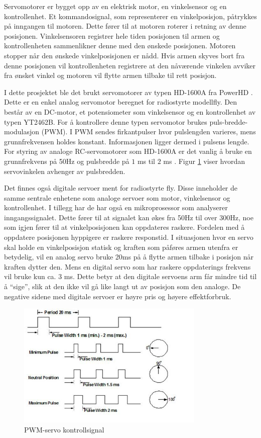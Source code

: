 Servomotorer er bygget opp av en elektrisk motor, en vinkelsensor og en kontrollenhet. Et kommandosignal, som representerer en vinkelposisjon, påtrykkes på inngangen til motoren. Dette fører til at motoren roterer i retning av denne posisjonen. Vinkelsensoren registrer hele tiden posisjonen til armen og kontrollenheten sammenlikner denne med den ønskede posisjonen. Motoren stopper når den ønskede vinkelposisjonen er nådd. Hvis armen skyves bort fra denne posisjonen vil kontrollenheten registrere at den nåværende vinkelen avviker fra ønsket vinkel og motoren vil flytte armen tilbake til rett posisjon. 

I dette prosjektet ble det brukt servomotorer av typen HD-1600A fra PowerHD \cite{PowerHD}. Dette er en enkel analog servomotor beregnet for radiostyrte modellfly. Den består av en DC-motor, et potensiometer som vinkelsensor og en kontrollenhet av typen YT2462B. For å kontrollere denne typen servomotor brukes puls-bredde-modulasjon (PWM). I PWM sendes firkantpulser hvor pulslengden varieres, mens grunnfrekvensen holdes konstant. Informasjonen ligger dermed i pulsens lengde. For styring av analoge RC-servomotorer som HD-1600A er det vanlig å bruke en grunnfrekvens på 50Hz og pulsbredde på $1$ ms til $2$ ms \cite{PCBheaven}. Figur \ref{fig:PWM} viser hvordan servovinkelen avhenger av pulsbredden.

Det finnes også digitale servoer ment for radiostyrte fly. Disse inneholder de samme sentrale enhetene som analoge servoer som motor, vinkelsensor og kontrollenhet. I tillegg har de har også en mikroprosessor som analyserer inngangssignalet. Dette fører til at signalet kan økes fra 50Hz til over 300Hz, noe som igjen fører til at vinkelposisjonen kan oppdateres raskere. Fordelen med å oppdatere posisjonen hyppigere er raskere responstid. I situasjonen hvor en servo skal holde en vinkelposisjon statisk og kraften som påføres armen utenfra er betydelig, vil en analog servo bruke 20ms på å flytte armen tilbake i posisjon når kraften dytter den. Mens en digital servo som har raskere oppdaterings frekvens vil bruke kun ca. $3$ ms. Dette betyr at den digitale servoens arm får mindre tid til å ``sige'', slik at den ikke vil gå like langt ut av posisjon som den analoge. De negative sidene med digitale servoer er høyre pris og høyere effektforbruk.    

\begin{figure}[H]
\centering
\includegraphics[width=0.8\textwidth]{img/pwm_servo.jpg}
\caption{PWM-servo kontrollsignal \cite{PWM}}
\label{fig:PWM}
\end{figure}   

